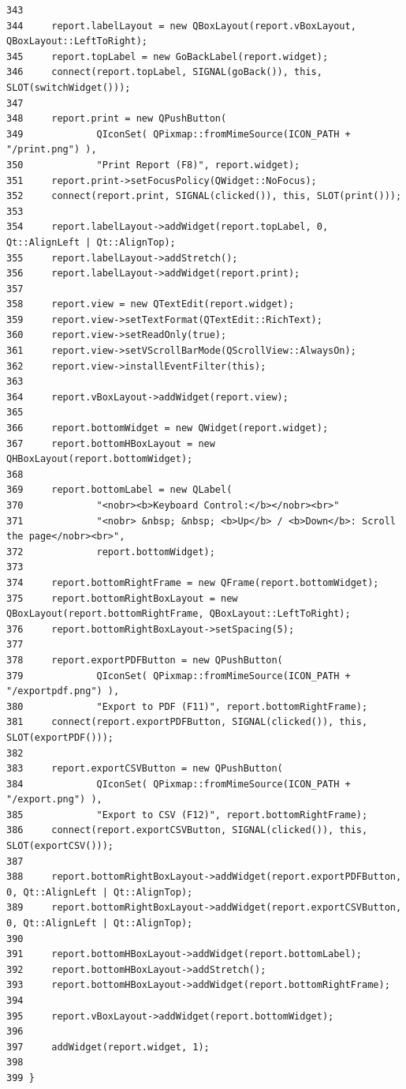 \begin{verbatim}
343     
344     report.labelLayout = new QBoxLayout(report.vBoxLayout, QBoxLayout::LeftToRight);
345     report.topLabel = new GoBackLabel(report.widget);
346     connect(report.topLabel, SIGNAL(goBack()), this, SLOT(switchWidget()));
347     
348     report.print = new QPushButton(
349             QIconSet( QPixmap::fromMimeSource(ICON_PATH + "/print.png") ),
350             "Print Report (F8)", report.widget);
351     report.print->setFocusPolicy(QWidget::NoFocus);
352     connect(report.print, SIGNAL(clicked()), this, SLOT(print()));
353     
354     report.labelLayout->addWidget(report.topLabel, 0, Qt::AlignLeft | Qt::AlignTop);
355     report.labelLayout->addStretch();
356     report.labelLayout->addWidget(report.print);
357     
358     report.view = new QTextEdit(report.widget);
359     report.view->setTextFormat(QTextEdit::RichText);
360     report.view->setReadOnly(true);
361     report.view->setVScrollBarMode(QScrollView::AlwaysOn);
362     report.view->installEventFilter(this);
363     
364     report.vBoxLayout->addWidget(report.view);
365     
366     report.bottomWidget = new QWidget(report.widget);
367     report.bottomHBoxLayout = new QHBoxLayout(report.bottomWidget);
368     
369     report.bottomLabel = new QLabel(
370             "<nobr><b>Keyboard Control:</b></nobr><br>"
371             "<nobr> &nbsp; &nbsp; <b>Up</b> / <b>Down</b>: Scroll the page</nobr><br>",
372             report.bottomWidget);
373     
374     report.bottomRightFrame = new QFrame(report.bottomWidget);
375     report.bottomRightBoxLayout = new QBoxLayout(report.bottomRightFrame, QBoxLayout::LeftToRight);
376     report.bottomRightBoxLayout->setSpacing(5);
377     
378     report.exportPDFButton = new QPushButton(
379             QIconSet( QPixmap::fromMimeSource(ICON_PATH + "/exportpdf.png") ),
380             "Export to PDF (F11)", report.bottomRightFrame);
381     connect(report.exportPDFButton, SIGNAL(clicked()), this, SLOT(exportPDF()));
382     
383     report.exportCSVButton = new QPushButton(
384             QIconSet( QPixmap::fromMimeSource(ICON_PATH + "/export.png") ),
385             "Export to CSV (F12)", report.bottomRightFrame);
386     connect(report.exportCSVButton, SIGNAL(clicked()), this, SLOT(exportCSV()));
387     
388     report.bottomRightBoxLayout->addWidget(report.exportPDFButton, 0, Qt::AlignLeft | Qt::AlignTop);
389     report.bottomRightBoxLayout->addWidget(report.exportCSVButton, 0, Qt::AlignLeft | Qt::AlignTop);
390     
391     report.bottomHBoxLayout->addWidget(report.bottomLabel);
392     report.bottomHBoxLayout->addStretch();
393     report.bottomHBoxLayout->addWidget(report.bottomRightFrame);
394     
395     report.vBoxLayout->addWidget(report.bottomWidget);
396     
397     addWidget(report.widget, 1);
398     
399 }
\end{verbatim}\normalsize 


